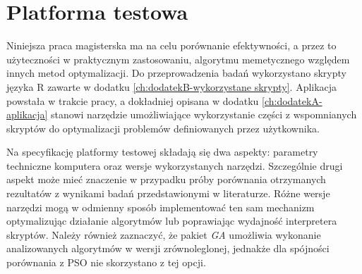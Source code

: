 \section{Platforma testowa}
\par
Niniejsza praca magisterska ma na celu porównanie efektywności, a przez to użyteczności w praktycznym zastosowaniu, algorytmu memetycznego względem innych metod optymalizacji. Do przeprowadzenia badań wykorzystano skrypty języka R zawarte w dodatku \ref{ch:dodatekB-wykorzystane skrypty}. Aplikacja powstała w trakcie pracy, a dokładniej opisana w dodatku \ref{ch:dodatekA-aplikacja} stanowi narzędzie umożliwiające wykorzystanie części z wspomnianych skryptów do optymalizacji problemów definiowanych przez użytkownika.
\par
Na specyfikację platformy testowej składają się dwa aspekty: parametry techniczne komputera oraz wersje wykorzystanych narzędzi. Szczególnie drugi aspekt może mieć znaczenie w przypadku próby porównania otrzymanych rezultatów z wynikami badań przedstawionymi w literaturze. Różne wersje narzędzi mogą w odmienny sposób implementować ten sam mechanizm optymalizując działanie algorytmów lub poprawiając wydajność interpretera skryptów. Należy również zaznaczyć, że pakiet \emph{GA} umożliwia wykonanie analizowanych algorytmów w wersji zrównoleglonej, jednakże dla spójności porównania z PSO nie skorzystano z tej opcji.
